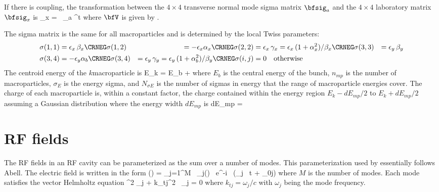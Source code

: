 If there is coupling, the transformation between the $4\times 4$
transverse normal mode sigma matrix $\bfsig_a$ and the $4\times 4$
laboratory matrix $\bfsig_x$ is
\Begineq
  \bfsig_x = \bfV \, \bfsig_a \bfV^t
\Endeq
where $\bfV$ is given by .

The sigma matrix is the same for all macroparticles and is
determined by the local Twiss parameters:
\begin{align}
  \sigma(1,1) &= \epsilon_x \, \beta_x \CRNEG
  \sigma(1,2) &= -\epsilon_x \alpha_x  \CRNEG
  \sigma(2,2) &= \epsilon_x \, \gamma_x = 
      \epsilon_x \, (1 + \alpha_x^2) / \beta_x \CRNEG
  \sigma(3,3) &= \epsilon_y \, \beta_y \\
  \sigma(3,4) &= -\epsilon_y \alpha_b \CRNEG
  \sigma(3,4) &= \epsilon_y \, \gamma_y = 
      \epsilon_y \, (1 + \alpha_b^2) / \beta_y \CRNEG
  \sigma(i,j) &= 0 \quad \mbox{otherwise} \nonumber
\end{align}
The centroid energy of the $k$\Th macroparticle is
\Begineq
  E_k = E_b + 
\Endeq
where $E_b$ is the central energy of the bunch, $n_{mp}$ is the number
of macroparticles, $\sigma_E$ is the energy sigma, and
$N_{\sigma E}$ is the number of sigmas in energy that the range of
macroparticle energies cover. The charge of each macroparticle is,
within a constant factor, the charge contained within the energy
region $E_k - dE_{mp}/2$ to $E_k + dE_{mp}/2$ assuming a Gaussian
distribution where the energy width $dE_{mp}$ is
\Begineq
  dE_{mp} = 
\Endeq

\section{RF fields}
\label{s:rf.fields.phys}

The RF fields in an RF cavity can be parameterized as the sum over a
number of modes. This parameterization used by \bmad essentially
follows Abell\cite{b:rf.abell}. The electric field is written in the
form
\Begineq
  \bfE(\bfr) = \sum_{j=1}^M \, \bfE_j(\bfr) \, e^{-i \, (\omega_j \, t + \theta_{0j})}
  \label{eseei}
\Endeq
where $M$ is the number of modes. Each mode satisfies the vector Helmholtz
equation
\Begineq
  \nabla^2 \bfE_j + k_{tj}^2 \, \bfE_j = 0
  \label{bke}
\Endeq
where $k_{tj} = \omega_j/c$ with $\omega_j$ being the mode frequency.

